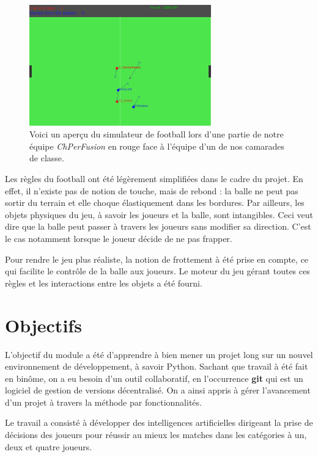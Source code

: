 \documentclass[12pt,a4paper]{article}
\begin{document}
\begin{figure}[!h]
  \centering
  \captionsetup{justification=centering}  
  \includegraphics[width=0.7\textwidth]{apercu}
  \caption[Un aper\c{c}u du jeu]{Voici un aper\c{c}u du simulateur de football 
  lors d'une partie de notre \'equipe {\itshape ChPerFusion} en rouge face \`a 
  l'\'equipe d'un de nos camarades de classe.}
  \label{fig:apercu}
\end{figure}

Les r\`egles du football ont \'et\'e l\'eg\`erement simplifi\'ees dans le cadre 
du projet. En effet, il n'existe pas de notion de touche, mais de rebond : la 
balle ne peut pas sortir du terrain et elle choque \'elastiquement dans les 
bordures. Par ailleurs, les objets physiques du jeu, \`a savoir les joueurs et 
la balle, sont intangibles. Ceci veut dire que la balle peut passer \`a travers 
les joueurs sans modifier sa direction. C'est le cas notamment lorsque le 
joueur d\'ecide de ne pas frapper.

Pour rendre le jeu plus r\'ealiste, la notion de frottement \`a \'et\'e prise 
en compte, ce qui facilite le contr\^ole de la balle aux joueurs.
Le moteur du jeu g\'erant toutes ces r\`egles et les interactions entre les 
objets a \'et\'e fourni.

\section*{Objectifs}
L’objectif du module a \'et\'e d'apprendre \`a bien mener un projet long 
sur un nouvel environnement de d\'eveloppement, \`a savoir 
Python. 
Sachant que travail \`a \'et\'e fait en bin\^ome, on a eu besoin d'un outil 
collaboratif, en l'occurrence {\bfseries git} qui est un logiciel de gestion de 
versions d\'ecentralis\'e. 
On a ainsi appris \`a g\'erer l'avancement d'un projet \`a travers la m\'ethode 
par fonctionnalit\'es.

Le travail a consist\'e \`a d\'evelopper des intelligences artificielles 
dirigeant la prise de d\'ecisions des joueurs pour r\'eussir au mieux les 
matches dans les cat\'egories \`a un, deux et quatre joueurs.
\end{document}
